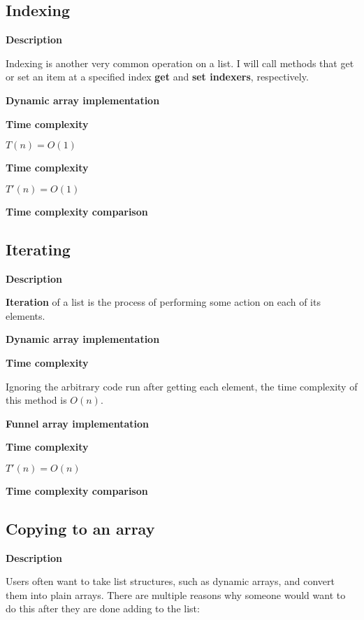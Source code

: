 \documentclass{article}
\newcommand{\descriptn}{\textbf{Description}}
\newcommand{\dynarrayimpl}{\textbf{Dynamic array implementation}}
\newcommand{\funarrayimpl}{\textbf{Funnel array implementation}}
\newcommand{\tcomplex}{\textbf{Time complexity}}
\newcommand{\tcomplexcmp}{\textbf{Time complexity comparison}}
\newcommand{\timefn}{T}
\newcommand{\timenewfn}{\timefn'}
\newcommand{\bigo}{O}
\newcommand{\varnitems}{n}
\begin{document}
	
	
	
	
	
	
	\subsection{Indexing}
	
	\descriptn
	
	Indexing is another very common operation on a list. I will call methods that get or set an item at a specified index \textbf{get} and \textbf{set indexers}, respectively.
	
	\dynarrayimpl
	
	\tcomplex
	
	$\timefn(\varnitems) = \bigo(1)$
	
	
	\tcomplex
	
	$\timenewfn(\varnitems) = \bigo(1)$
	
	\tcomplexcmp
	
	\subsection{Iterating}
	
	\descriptn
	
	\textbf{Iteration} of a list is the process of performing some action on each of its elements.
	
	\dynarrayimpl
	
	\tcomplex
	
	Ignoring the arbitrary code run after getting each element, the time complexity of this method is $\bigo(\varnitems)$.
	
	\funarrayimpl
	
	\tcomplex
	
	$\timenewfn(\varnitems) = \bigo(\varnitems)$
	
	\tcomplexcmp
	
	\subsection{Copying to an array}
	
	\descriptn
	
	Users often want to take list structures, such as dynamic arrays, and convert them into plain arrays. There are multiple reasons why someone would want to do this after they are done adding to the list:
	
\end{document}

